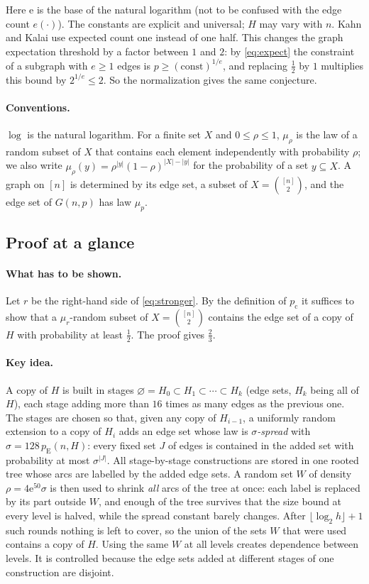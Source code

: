 \documentclass[11pt]{article}
\numberwithin{equation}{section}
\newcommand{\pc}{p_{\mathrm c}}
\newcommand{\pE}{p_{\mathrm E}}
\newcommand{\ee}{\mathrm e}
\begin{document}
Here $\ee$ is the base of the natural logarithm (not to be confused with
the edge count $e(\cdot)$). The constants are explicit and universal;
$H$ may vary with $n$. Kahn and Kalai use expected count one instead of
one half. This changes the graph expectation threshold by a factor
between $1$ and $2$: by \eqref{eq:expect} the constraint of a subgraph
with $e\ge1$ edges is $p\ge(\text{const})^{1/e}$, and replacing
$\frac12$ by $1$ multiplies this bound by $2^{1/e}\le2$. So the
normalization gives the same conjecture.

\paragraph{Conventions.}
$\log$ is the natural logarithm. For a finite set $X$ and
$0\le\rho\le1$, $\mu_\rho$ is the law of a random subset of $X$ that
contains each element independently with probability $\rho$; we also
write $\mu_\rho(y)=\rho^{|y|}(1-\rho)^{|X|-|y|}$ for the probability of
a set $y\subseteq X$. A graph on $[n]$ is determined by its edge set, a
subset of $X=\binom{[n]}2$, and the edge set of $G(n,p)$ has law $\mu_p$.

\subsection{Proof at a glance}\label{sec:glance}

\paragraph{What has to be shown.}
Let $r$ be the right-hand side of \eqref{eq:stronger}. By the definition
of $\pc$ it suffices to show that a $\mu_r$-random subset of
$X=\binom{[n]}2$ contains the edge set of a copy of $H$ with probability
at least $\frac12$. The proof gives $\frac23$.

\paragraph{Key idea.}
A copy of $H$ is built in stages
$\varnothing=H_0\subset H_1\subset\cdots\subset H_k$ (edge sets, $H_k$
being all of $H$), each stage adding more than $16$ times as many edges
as the previous one. The stages are chosen so that, given any copy of
$H_{i-1}$, a uniformly random extension to a copy of $H_i$ adds an edge
set whose law is \emph{$\sigma$-spread} with $\sigma=128\,\pE(n,H)$:
every fixed set $J$ of edges is contained in the added set with
probability at most $\sigma^{|J|}$. All stage-by-stage constructions are
stored in one rooted tree whose arcs are labelled by the added edge
sets. A random set $W$ of density $\rho=4\ee^{50}\sigma$ is then used
to shrink \emph{all} arcs of the tree at once: each label is replaced by
its part outside $W$, and enough of the tree survives that the size
bound at every level is halved, while the spread constant barely
changes. After $\lfloor\log_2 h\rfloor+1$ such rounds nothing is left
to cover, so the union of the sets $W$ that were used contains a copy of
$H$. Using the same $W$ at all levels creates dependence between
levels. It is controlled because the edge sets added at different
stages of one construction are disjoint.
\end{document}

